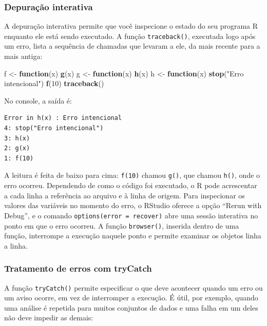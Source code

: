 \documentclass[
]{book}
\newenvironment{Shaded}{\begin{snugshade}}{\end{snugshade}}
\newcommand{\ControlFlowTok}[1]{\textcolor[rgb]{0.13,0.29,0.53}{\textbf{#1}}}
\newcommand{\DecValTok}[1]{\textcolor[rgb]{0.00,0.00,0.81}{#1}}
\newcommand{\FunctionTok}[1]{\textcolor[rgb]{0.13,0.29,0.53}{\textbf{#1}}}
\newcommand{\NormalTok}[1]{#1}
\newcommand{\OtherTok}[1]{\textcolor[rgb]{0.56,0.35,0.01}{#1}}
\newcommand{\StringTok}[1]{\textcolor[rgb]{0.31,0.60,0.02}{#1}}
\begin{document}
\subsubsection{Depuração interativa}\label{depurauxe7uxe3o-interativa}

A depuração interativa permite que você inspecione o estado do seu programa R enquanto ele está sendo executado. A função \texttt{traceback()}, executada logo após um erro, lista a sequência de chamadas que levaram a ele, da mais recente para a mais antiga:

\begin{Shaded}
\begin{Highlighting}[]
\NormalTok{f }\OtherTok{\textless{}{-}} \ControlFlowTok{function}\NormalTok{(x) }\FunctionTok{g}\NormalTok{(x)}
\NormalTok{g }\OtherTok{\textless{}{-}} \ControlFlowTok{function}\NormalTok{(x) }\FunctionTok{h}\NormalTok{(x)}
\NormalTok{h }\OtherTok{\textless{}{-}} \ControlFlowTok{function}\NormalTok{(x) }\FunctionTok{stop}\NormalTok{(}\StringTok{"Erro intencional"}\NormalTok{)}
\FunctionTok{f}\NormalTok{(}\DecValTok{10}\NormalTok{)}
\FunctionTok{traceback}\NormalTok{()}
\end{Highlighting}
\end{Shaded}

No console, a saída é:

\begin{verbatim}
Error in h(x) : Erro intencional
4: stop("Erro intencional")
3: h(x)
2: g(x)
1: f(10)
\end{verbatim}

A leitura é feita de baixo para cima: \texttt{f(10)} chamou \texttt{g()}, que chamou \texttt{h()}, onde o erro ocorreu. Dependendo de como o código foi executado, o R pode acrescentar a cada linha a referência ao arquivo e à linha de origem. Para inspecionar os valores das variáveis no momento do erro, o RStudio oferece a opção ``Rerun with Debug'', e o comando \texttt{options(error\ =\ recover)} abre uma sessão interativa no ponto em que o erro ocorreu. A função \texttt{browser()}, inserida dentro de uma função, interrompe a execução naquele ponto e permite examinar os objetos linha a linha.

\subsubsection{Tratamento de erros com tryCatch}\label{tratamento-de-erros-com-trycatch}

A função \texttt{tryCatch()} permite especificar o que deve acontecer quando um erro ou um aviso ocorre, em vez de interromper a execução. É útil, por exemplo, quando uma análise é repetida para muitos conjuntos de dados e uma falha em um deles não deve impedir as demais:
\end{document}
